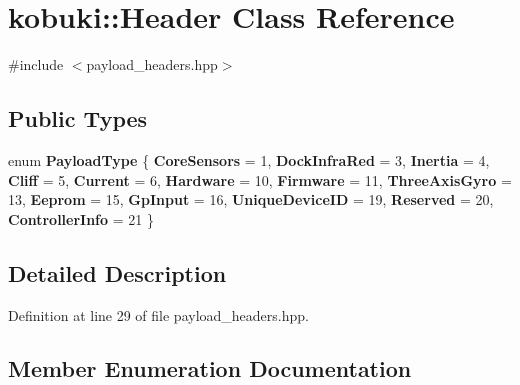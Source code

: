 \section{kobuki\-:\-:\-Header \-Class \-Reference}
\label{classkobuki_1_1Header}


{\ttfamily \#include $<$payload\-\_\-headers.\-hpp$>$}

\subsection*{\-Public \-Types}
\begin{DoxyCompactItemize}
\item 
enum {\bf \-Payload\-Type} \{ \*
{\bf \-Core\-Sensors} =  1, 
{\bf \-Dock\-Infra\-Red} =  3, 
{\bf \-Inertia} =  4, 
{\bf \-Cliff} =  5, 
\*
{\bf \-Current} =  6, 
{\bf \-Hardware} =  10, 
{\bf \-Firmware} =  11, 
{\bf \-Three\-Axis\-Gyro} =  13, 
\*
{\bf \-Eeprom} =  15, 
{\bf \-Gp\-Input} =  16, 
{\bf \-Unique\-Device\-I\-D} =  19, 
{\bf \-Reserved} =  20, 
\*
{\bf \-Controller\-Info} =  21
 \}
\end{DoxyCompactItemize}


\subsection{\-Detailed \-Description}


\-Definition at line 29 of file payload\-\_\-headers.\-hpp.



\subsection{\-Member \-Enumeration \-Documentation}
